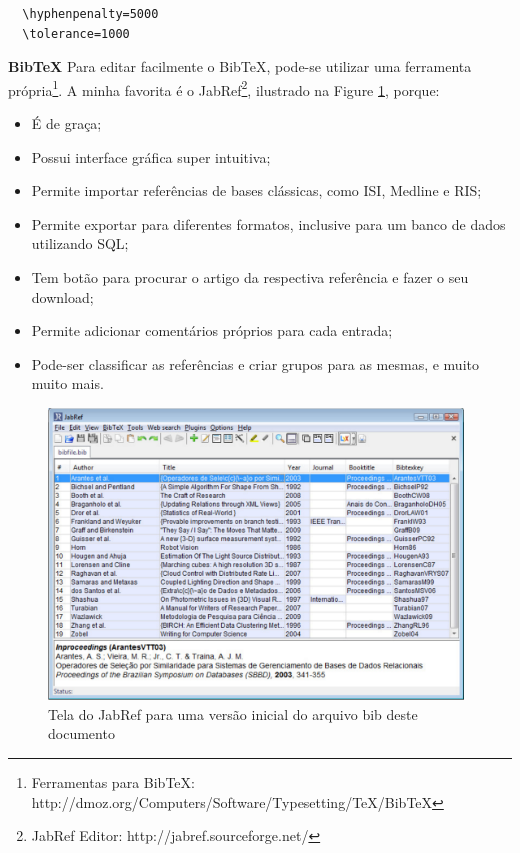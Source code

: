 \begin{anexosenv}
\begin{verbatim}
  \hyphenpenalty=5000
  \tolerance=1000
\end{verbatim}


\textbf{BibTeX} Para editar facilmente o BibTeX, pode-se utilizar uma ferramenta própria\footnote{Ferramentas para BibTeX: http://dmoz.org/Computers/Software/Typesetting/TeX/BibTeX}. A minha favorita é o JabRef\footnote{JabRef Editor: http://jabref.sourceforge.net/}, ilustrado na Figure \ref{fig:jabref}, porque:

\begin{itemize}\addtolength{\itemsep}{-0.5\baselineskip}
	\item É de graça;
	\item Possui interface gráfica super intuitiva;
	\item Permite importar referências de bases clássicas, como ISI, Medline e RIS;
	\item Permite exportar para diferentes formatos, inclusive para um banco de dados utilizando SQL;
	\item Tem botão para procurar o artigo da respectiva referência e fazer o seu download;
	\item Permite adicionar comentários próprios para cada entrada;
	\item Pode-ser classificar as referências e criar grupos para as mesmas, e muito muito mais.
\end{itemize}

\begin{figure}[tb]
	\centering
		\includegraphics[width=0.98\textwidth]{img/jabref}
	\caption{Tela do JabRef para uma versão inicial do arquivo bib deste documento}
	\label{fig:jabref}
\end{figure}


\end{anexosenv}

